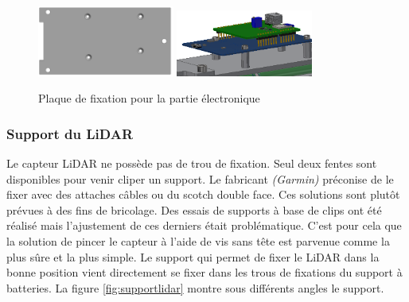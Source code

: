 \begin{figure}[H]
    \centering
    \includegraphics[width=0.4\textwidth]{Images/photos_PGA/plaquesmodule.PNG}
    \includegraphics[width=0.4\textwidth]{Images/photos_PGA/PCB.PNG}
    \caption{Plaque de fixation pour la partie électronique}
    \label{fig:fixelectronique}
\end{figure}

\subsubsection{Support du LiDAR}

Le capteur LiDAR ne possède pas de trou de fixation. Seul deux fentes sont disponibles pour venir 
cliper un support. Le fabricant \emph{(Garmin)} préconise de le fixer avec des attaches câbles ou du scotch 
double face. Ces solutions sont plutôt prévues à des fins de bricolage. Des essais de supports à base 
de clips ont été réalisé mais l’ajustement de ces derniers était problématique. C’est pour cela que la 
solution de pincer le capteur à l’aide de vis sans tête est parvenue comme la plus sûre et la plus simple. 
Le support qui permet de fixer le LiDAR dans la bonne position vient directement se fixer dans les 
trous de fixations du support à batteries. La figure \ref{fig:supportlidar} montre sous différents angles 
le support.


